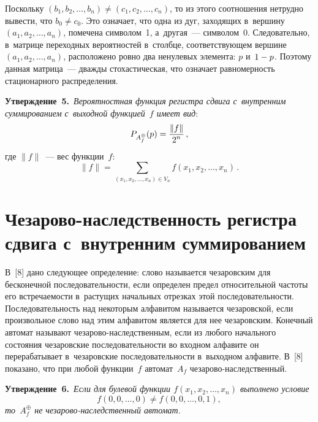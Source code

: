 \begin{multicols}{2}
  Поскольку $(b_1,b_2,\ldots ,b_n)\not= (c_1,c_2,\ldots , c_n)$, то из этого 
соотношения нетрудно вывести, что $b_0\not= c_0$. Это означает, что одна из 
дуг, заходящих в~вершину $(a_1, a_2, \ldots , a_n)$, помечена символом~1, 
а~другая~--- символом~0. Следовательно, в~матрице переходных 
вероятностей в~столбце, соответствующем вершине $(a_1, a_2, \ldots , a_n)$, 
расположено ровно два ненулевых элемента: $p$ и~$1\hm-p$. Поэтому данная 
матрица~--- дваж\-ды стохастическая, что означает равномерность стационарного 
распределения. 
  
  \smallskip
  
  \noindent
  \textbf{Утверждение~5.}\ \textit{Вероятностная функция регистра сдвига 
с~внутренним суммированием с~выходной функцией~$f$ имеет вид}:
  $$
  P_{A_f^{\oplus}}(p)=\displaystyle\frac{\displaystyle \| f\|\mathstrut}{\displaystyle 2^n\mathstrut}\,,
  $$ 
  где $\|f\|$~--- вес функции~$f$:
  $$
  \|f\|= \sum\limits_{(x_1,x_2,\ldots ,x_n)\in V_n} f\left(x_1,x_2,\ldots , x_n\right)\,.
  $$

\section{Чезарово-наследственность регистра сдвига 
с~внутренним суммированием}

  В~[8] дано следующее определение: слово называется чезаровским для 
бесконечной последовательности, если определен предел относительной 
частоты его встречаемости в~растущих начальных отрезках этой 
последовательности. Последовательность над некоторым алфавитом 
называется чезаровской, если произвольное слово над этим алфавитом является 
для нее чезаровским. Конечный автомат называют че\-за\-ро\-во-на\-след\-ст\-вен\-ным, 
если из любого начального состояния чезаровские 
последовательности во входном алфавите он перерабатывает в~чезаровские 
последовательности в~выходном алфавите. В~[8] показано, что при любой 
функции~$f$ автомат~$A_f$ че\-за\-ро\-во-на\-след\-ст\-вен\-ный.
  
  \smallskip
  
  \noindent
  \textbf{Утверждение~6.}\ \textit{Если для булевой функции $f(x_1,x_2,\ldots , 
x_n)$ выполнено условие 
$$
f(0,0,\ldots ,0)\not= f(0,0,\ldots , 0,1),
$$ 
то~$A_f^{\oplus}$ не  
че\-за\-ро\-во-на\-след\-ст\-вен\-ный автомат}.
  
  \smallskip
  

\end{multicols}
